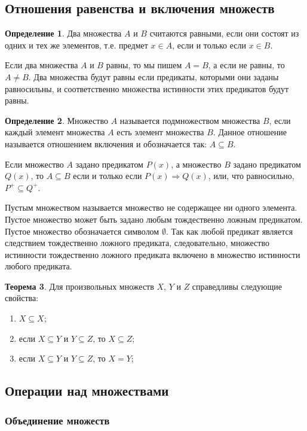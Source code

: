 \documentclass[letterpaper, 10pt]{article}
\theoremstyle{definition}
\newtheorem{thm}{Теорема}[section]
\newtheorem{define}[thm]{Определение}
\begin{document}
\subsection{Отношения равенства и включения множеств}
\begin{define}
	Два множества $A$ и $B$ считаются равными, если они состоят из одних и тех
	же элементов, т.е. предмет $x \in A$, если и только если $x \in B$.
\end{define}
	Если два множества $A$ и $B$ равны, то мы пишем $A = B$, а если не равны, то
	$A \neq B$.
	Два множества будут равны если предикаты, которыми они заданы равносильны, и
	соответственно множества истинности этих предикатов будут равны.
	\begin{define}
		Множество $A$ называется подмножеством множества $B$, если каждый
		элемент множества $A$ есть элемент множества $B$. Данное отношение
		называется отношением включения и обозначается так: $A \subseteq B$.
	\end{define}
	Если множество $A$ задано предикатом $P(x)$, а множество $B$ задано
	предикатом $Q(x)$, то $A \subseteq B$ если и только если $P(x) \Rightarrow
	Q(x)$, или, что равносильно, $P^+ \subseteq Q^+$.

	Пустым множеством называется множество не содержащее ни одного элемента.
	Пустое множество может быть задано любым тождественно ложным предикатом.
	Пустое множество обозначается символом $\emptyset$. Так как любой предикат
	является следствием тождественно ложного предиката, следовательно, множество
	истинности тождественно ложного предиката включено в множество истинности
	любого предиката.

	\begin{thm}
		Для произвольных множеств $X$, $Y$ и $Z$ справедливы следующие свойства:
		\begin{enumerate}
			\item $X \subseteq X$;
			\item если $X \subseteq Y$ и $Y \subseteq Z$, то $X \subseteq Z$;
			\item если $X \subseteq Y$ и $Y \subseteq Z$, то $X = Y$;
		\end{enumerate}
	\end{thm}

	\subsection{Операции над множествами}
	
	\subsubsection{Объединение множеств}
\end{document}
